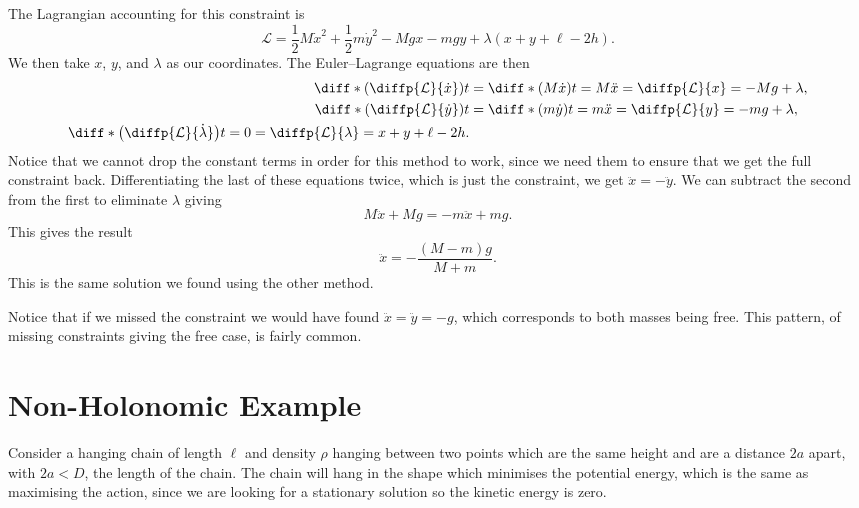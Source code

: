 \documentclass[fleqn]{NotesClass}
\newcommand*{\lagrangian}{\mathcal{L}}
\begin{document}
    The Lagrangian accounting for this constraint is
    \begin{equation}
        \lagrangian = \frac{1}{2}M\dot{x}^2 + \frac{1}{2}m\dot{y}^2 - Mgx - mgy + \lambda(x + y + \ell - 2h).
    \end{equation}
    We then take \(x\), \(y\), and \(\lambda\) as our coordinates.
    The Euler--Lagrange equations are then
    \begin{align}
        \diff*{\left( \diffp{\lagrangian}{\dot{x}} \right)}{t} &= \diff*{(M\dot{x})}{t} = M\ddot{x} = \diffp{\lagrangian}{x} = -Mg + \lambda,\\
        \diff*{\left( \diffp{\lagrangian}{\dot{y}} \right)}{t} &= \diff*{(m\dot{y})}{t} = m\ddot{x} = \diffp{\lagrangian}{y} = -mg + \lambda,\\
        \diff*{\left( \diffp{\lagrangian}{\dot{\lambda}} \right)}{t} = 0 = \diffp{\lagrangian}{\lambda} = x + y + \ell - 2h.
    \end{align}
    Notice that we cannot drop the constant terms in order for this method to work, since we need them to ensure that we get the full constraint back.
    Differentiating the last of these equations twice, which is just the constraint, we get \(\ddot{x} = -\ddot{y}\).
    We can subtract the second from the first to eliminate \(\lambda\) giving
    \begin{equation}
        M\ddot{x} + Mg = -m\ddot{x} + mg.
    \end{equation}
    This gives the result
    \begin{equation}
        \ddot{x} = -\frac{(M - m)g}{M + m}.
    \end{equation}
    This is the same solution we found using the other method.
    
    Notice that if we missed the constraint we would have found \(\ddot{x} = \ddot{y} = -g\), which corresponds to both masses being free.
    This pattern, of missing constraints giving the free case, is fairly common.
    
    \section{Non-Holonomic Example}
    Consider a hanging chain of length \(\ell\) and density \(\rho\) hanging between two points which are the same height and are a distance \(2a\) apart, with \(2a < D\), the length of the chain.
    The chain will hang in the shape which minimises the potential energy, which is the same as maximising the action, since we are looking for a stationary solution so the kinetic energy is zero.
    
\end{document}
